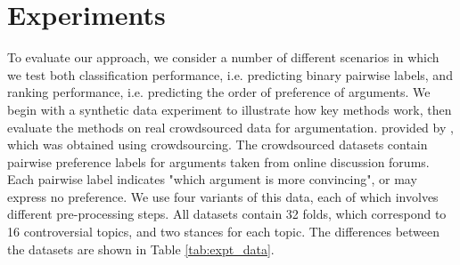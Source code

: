 \section{Experiments}\label{sec:expts}



To evaluate our approach, we consider a number of different scenarios in which we test both classification performance, i.e. predicting binary pairwise labels, and ranking performance, i.e. predicting the order of preference of arguments.
We begin with a synthetic data experiment to illustrate how key methods work,
then evaluate the methods on real crowdsourced data for argumentation.
provided by \cite{habernal2016argument}, which was obtained using crowdsourcing.
The crowdsourced datasets contain pairwise preference labels for arguments taken from online discussion forums. 
Each pairwise label indicates "which argument is more convincing", or may express no preference.
We use four variants of this data, each of which involves different pre-processing steps.
All datasets contain 32 folds, which correspond to 16 controversial topics, and two stances for each topic.
The differences between the datasets are shown in Table \ref{tab:expt_data}.
